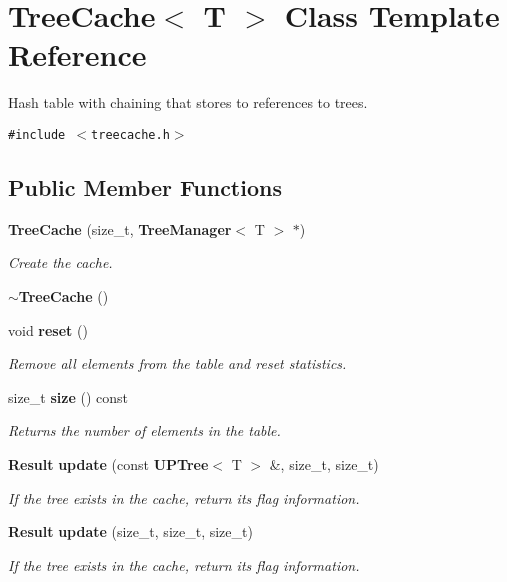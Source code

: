 \section{Tree\-Cache$<$ T $>$ Class Template Reference}
\label{classTreeCache}
Hash table with chaining that stores to references to trees.  


{\tt \#include $<$treecache.h$>$}

\subsection*{Public Member Functions}
\begin{CompactItemize}
\item 
{\bf Tree\-Cache} (size\_\-t, {\bf Tree\-Manager}$<$ T $>$ $\ast$)
\begin{CompactList}\small\item\em Create the cache. \item\end{CompactList}\item 
{\bf $\sim$Tree\-Cache} ()
\item 
void {\bf reset} ()
\begin{CompactList}\small\item\em Remove all elements from the table and reset statistics. \item\end{CompactList}\item 
size\_\-t {\bf size} () const 
\begin{CompactList}\small\item\em Returns the number of elements in the table. \item\end{CompactList}\item 
{\bf Result} {\bf update} (const {\bf UPTree}$<$ T $>$ \&, size\_\-t, size\_\-t)
\begin{CompactList}\small\item\em If the tree exists in the cache, return its flag information. \item\end{CompactList}\item 
{\bf Result} {\bf update} (size\_\-t, size\_\-t, size\_\-t)
\begin{CompactList}\small\item\em If the tree exists in the cache, return its flag information. \item\end{CompactList}\end{CompactItemize}

